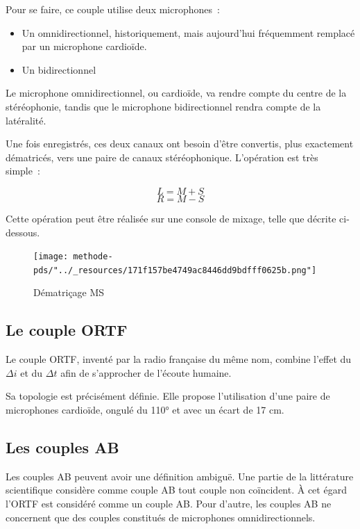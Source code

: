 \documentclass[
  letterpaper,
  DIV=11,
  numbers=noendperiod]{scrreprt}
\providecommand{\tightlist}{%
  \setlength{\itemsep}{0pt}\setlength{\parskip}{0pt}}\usepackage{longtable,booktabs,array}
\begin{document}
Pour se faire, ce couple utilise deux microphones~:

\begin{itemize}
\tightlist
\item
  Un omnidirectionnel, historiquement, mais aujourd'hui fréquemment
  remplacé par un microphone cardioïde.
\item
  Un bidirectionnel
\end{itemize}

Le microphone omnidirectionnel, ou cardioïde, va rendre compte du centre
de la stéréophonie, tandis que le microphone bidirectionnel rendra
compte de la latéralité.

Une fois enregistrés, ces deux canaux ont besoin d'être convertis, plus
exactement dématricés, vers une paire de canaux stéréophonique.
L'opération est très simple~:

\[L = M+S\] \[R = M-S\]

Cette opération peut être réalisée sur une console de mixage, telle que
décrite ci-dessous.

\begin{figure}

{\centering \texttt{[image: methode-pds/"../\_resources/171f157be4749ac8446dd9bdfff0625b.png"]}

}

\caption{Dématriçage MS}

\end{figure}

\hypertarget{le-couple-ortf}{%
\subsection{Le couple ORTF}\label{le-couple-ortf}}

Le couple ORTF, inventé par la radio française du même nom, combine
l'effet du \(\Delta i\) et du \(\Delta t\) afin de s'approcher de
l'écoute humaine.

Sa topologie est précisément définie. Elle propose l'utilisation d'une
paire de microphones cardioïde, ongulé du 110° et avec un écart de 17
cm.

\hypertarget{les-couples-ab}{%
\subsection{Les couples AB}\label{les-couples-ab}}

Les couples AB peuvent avoir une définition ambiguë. Une partie de la
littérature scientifique considère comme couple AB tout couple non
coïncident. À cet égard l'ORTF est considéré comme un couple AB. Pour
d'autre, les couples AB ne concernent que des couples constitués de
microphones omnidirectionnels.
\end{document}
